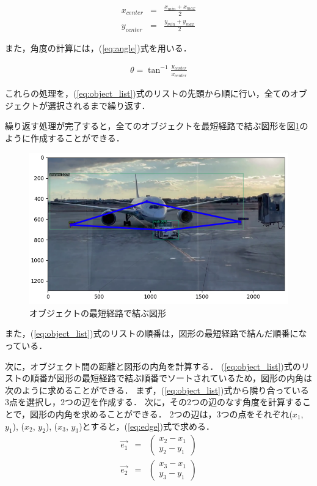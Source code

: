 \documentclass[a4j,12pt,dvipdfmx]{jreport}
\begin{document}
\begin{eqnarray}
  \label{eq:center}
  x_{center} &=& \frac{x_{min}+x_{max}}{2} \\
  y_{center} &=& \frac{y_{min}+y_{max}}{2}
\end{eqnarray}

また，角度の計算には，(\ref{eq:angle})式を用いる．

\begin{eqnarray}
  \label{eq:angle}
  \theta = \tan^{-1} \frac{y_{center}}{x_{center}}
\end{eqnarray}

これらの処理を，(\ref{eq:object_list})式のリストの先頭から順に行い，全てのオブジェクトが選択されるまで繰り返す．

繰り返す処理が完了すると，全てのオブジェクトを最短経路で結ぶ図形を図\ref{fig:figure_2}のように作成することができる．

\begin{figure}[b]
  \begin{center}
    \includegraphics[width=15cm]{./image/figure_2.png}
    \caption{オブジェクトの最短経路で結ぶ図形}
    \label{fig:figure_2}
  \end{center}
\end{figure}

また，(\ref{eq:object_list})式のリストの順番は，図形の最短経路で結んだ順番になっている．

次に，オブジェクト間の距離と図形の内角を計算する．
(\ref{eq:object_list})式のリストの順番が図形の最短経路で結ぶ順番でソートされているため，図形の内角は次のように求めることができる．
まず，(\ref{eq:object_list})式から隣り合っている3点を選択し，2つの辺を作成する．
次に，その2つの辺のなす角度を計算することで，図形の内角を求めることができる．
2つの辺は，3つの点をそれぞれ($x_1$, $y_1$), ($x_2$, $y_2$), ($x_3$, $y_3$)とすると，(\ref{eq:edge})式で求める．
\begin{eqnarray}
  \label{eq:edge}
  \vec{e_1} &=& \left( \begin{array}{c} x_2-x_1 \\ y_2-y_1 \end{array} \right) \\
  \vec{e_2} &=& \left( \begin{array}{c} x_3-x_1 \\ y_3-y_1 \end{array} \right)
\end{eqnarray}
\end{document}
